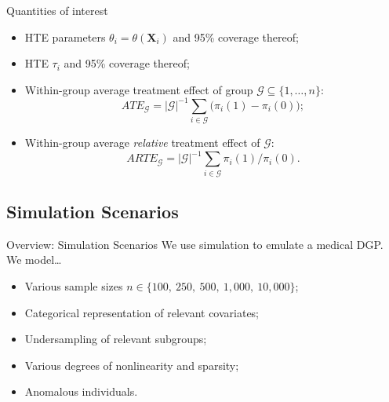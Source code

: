 \documentclass[11pt]{beamer}
\newcommand{\X}{\mathbf{X}}
\newcommand{\G}{\mathcal{G}}
\begin{document}
\begin{frame}{Quantities of interest}
\begin{itemize}\setlength\itemsep{1em}
	\item HTE parameters $\theta_i = \theta(\X_i)$ and 95\% coverage thereof;
	\item HTE $\tau_i$ and 95\% coverage thereof;
	\item Within-group average treatment effect of group $\G\subseteq\{1,\dots,n\}$:
	\[
	 	ATE_{\G} = |\G|^{-1}\sum_{i\in\G} \Big(\pi_i(1) - \pi_i(0)\Big);
	 \]
	 \item Within-group average \textit{relative} treatment effect of $\G$:
	 \[
	 	ARTE_{\G} = |\G|^{-1}\sum_{i\in\G} \pi_i(1) \Big/ \pi_i(0).
	 \]
\end{itemize}
\end{frame}


\subsection{Simulation Scenarios}


\begin{frame}{Overview: Simulation Scenarios}
We use simulation to emulate a medical DGP. We model\dots \bigskip
\begin{itemize}\setlength\itemsep{1em}
	\item Various sample sizes $n\in\{100,\ 250,\ 500,\ 1,000,\ 10,000\}$;
	\item Categorical representation of relevant covariates;
	\item Undersampling of relevant subgroups;
	\item Various degrees of nonlinearity and sparsity;
	\item Anomalous individuals.
\end{itemize} 
\end{frame}
\end{document}
